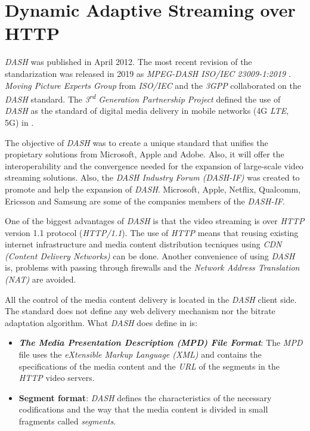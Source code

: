 \section{Dynamic Adaptive Streaming over HTTP}
\label{sec:dash}

\textit{DASH} was published in April 2012. 
The most recent revision of the standarization was released in 2019 as 
\textit{MPEG-DASH ISO/IEC 23009-1:2019} \cite{ISO23009}. 
 \textit{Moving Picture Experts Group} from \textit{ISO/IEC} and the \textit{3GPP} collaborated on
the \textit{DASH} standard. The \textit{3\textsuperscript{rd} Generation Partnership Project} defined the use of
\textit{DASH} as the standard of digital media delivery in mobile networks (4G \textit{LTE}, 5G) in \cite{3gpp1}.

The objective of \textit{DASH} was to create a unique standard that unifies the propietary solutions
from Microsoft, Apple and Adobe. Also, it will offer the interoperability and the convergence needed for 
the expansion of large-scale video streaming solutions. Also, the \textit{DASH Industry Forum (DASH-IF)} was created to promote and help the expansion of
\textit{DASH}. Microsoft, Apple, Netflix, Qualcomm, Ericsson and Samsung are some of the companies
members of the \textit{DASH-IF}.

One of the biggest advantages of \textit{DASH} is that the video streaming is over \textit{HTTP} version 1.1 protocol
(\textit{HTTP/1.1}). The use of \textit{HTTP} means that reusing existing internet infrastructure and
media content distribution tecniques using \textit{CDN (Content Delivery Networks)} can be done.
Another convenience of using \textit{DASH} is, problems
with passing through firewalls and the \textit{Network Address Translation (NAT)}
are avoided.

All the control of the media content delivery is located in the \textit{DASH} client side. The
standard does not define any web delivery mechanism nor the bitrate adaptation algorithm. What \textit{DASH}
does define in \cite{ISO23009} is:

\begin{itemize}
  \item \textit{\textbf{The Media Presentation Description (MPD) File Format}}: The \textit{MPD} file
  uses the \textit{eXtensible Markup Language (XML)} and
  contains the specifications of the media content and the \textit{URL} of the segments
  in the \textit{HTTP} video servers.
  \item \textbf{Segment format}: \textit{DASH} defines the characteristics of the necessary
  codifications and the way that the media content is divided in small fragments called 
  \textit{segments}.
\end{itemize}



